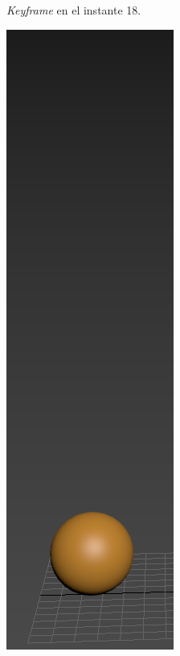 \documentclass{article}
\begin{document}
\begin{figure}[H]
\begin{subfigure}[H]{0.15\textwidth}
	    \caption{\textit{Keyframe} en el instante 18.}
	\end{subfigure}
    \hfill
	\begin{subfigure}[H]{0.15\textwidth}
	    \centering
	    \includegraphics[width=\textwidth]{imagenes/Ejercicio 2/p1_suelo2.png}

\end{subfigure}
\end{figure}
\end{document}
